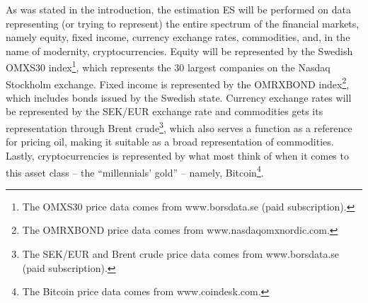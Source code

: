 \documentclass[a4paper,11pt]{article}
\theoremstyle{definition}
\theoremstyle{definition}
\theoremstyle{definition}
\theoremstyle{definition}
\theoremstyle{remark}
\begin{document}
As was stated in the introduction, the estimation ES will be performed on data representing (or trying to represent) the entire spectrum of the financial markets, namely equity, fixed income, currency exchange rates, commodities, and, in the name of modernity, cryptocurrencies. Equity will be represented by the Swedish OMXS30 index\footnote{The OMXS30 price data comes from www.borsdata.se (paid subscription).}, which represents the 30 largest companies on the Nasdaq Stockholm exchange. Fixed income is represented by the OMRXBOND index\footnote{The OMRXBOND price data comes from www.nasdaqomxnordic.com.}, which includes bonds issued by the Swedish state. Currency exchange rates will be represented by the SEK/EUR exchange rate and commodities gets its representation through Brent crude\footnote{The SEK/EUR and Brent crude price data comes from www.borsdata.se (paid subscription).}, which also serves a function as a reference for pricing oil, making it suitable as a broad representation of commodities. Lastly, cryptocurrencies is represented by what most think of when it comes to this asset class -- the ``millennials' gold'' -- namely, Bitcoin\footnote{The Bitcoin price data comes from www.coindesk.com.}.
\end{document}
